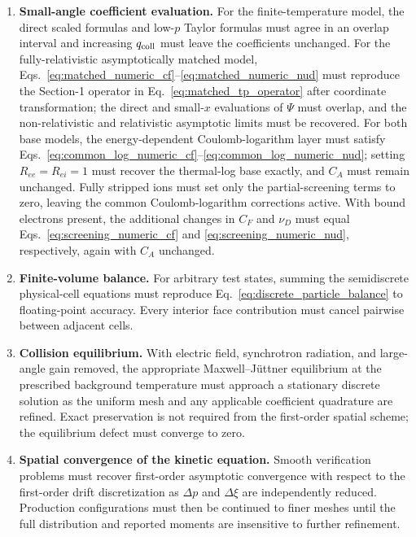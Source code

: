 \documentclass[11pt]{article}
\begin{document}
\begin{enumerate}
 \item \textbf{Small-angle coefficient evaluation.}
       For the finite-temperature model, the direct scaled formulas and low-$p$ Taylor
       formulas must agree in an overlap interval and increasing $q_{\rm coll}$ must
       leave the coefficients unchanged.  For the fully-relativistic asymptotically matched model,
       Eqs.~\eqref{eq:matched_numeric_cf}--\eqref{eq:matched_numeric_nud} must reproduce the
       Section-1 operator in Eq.~\eqref{eq:matched_tp_operator} after coordinate
       transformation; the direct and small-$x$ evaluations of $\Psi$ must overlap, and
       the non-relativistic and relativistic asymptotic limits must be recovered.
       For both base models, the energy-dependent Coulomb-logarithm layer must satisfy
       Eqs.~\eqref{eq:common_log_numeric_cf}--\eqref{eq:common_log_numeric_nud}; setting
       $R_{ee}=R_{ei}=1$ must recover the thermal-log base exactly, and $C_A$ must remain
       unchanged.  Fully stripped ions must set only the partial-screening terms to zero,
       leaving the common Coulomb-logarithm corrections active.  With bound electrons
       present, the additional changes in $C_F$ and $\nu_D$ must equal
       Eqs.~\eqref{eq:screening_numeric_cf} and \eqref{eq:screening_numeric_nud},
       respectively, again with $C_A$ unchanged.

 \item \textbf{Finite-volume balance.}
       For arbitrary test states, summing the semidiscrete physical-cell equations must
       reproduce Eq.~\eqref{eq:discrete_particle_balance} to floating-point accuracy.
       Every interior face contribution must cancel pairwise between adjacent cells.

 \item \textbf{Collision equilibrium.}
       With electric field, synchrotron radiation, and large-angle gain removed, the
       appropriate Maxwell--J{\"u}ttner equilibrium at the prescribed background
       temperature must approach a stationary discrete solution as the uniform mesh and
       any applicable coefficient quadrature are refined.  Exact preservation is not
       required from the first-order spatial scheme; the equilibrium defect must converge
       to zero.

 \item \textbf{Spatial convergence of the kinetic equation.}
       Smooth verification problems must recover first-order asymptotic convergence with
       respect to the first-order drift discretization as $\Delta p$ and $\Delta\xi$ are independently
       reduced.  Production configurations must then be continued to finer meshes until
       the full distribution and reported moments are insensitive to further refinement.


\end{enumerate}
\end{document}
